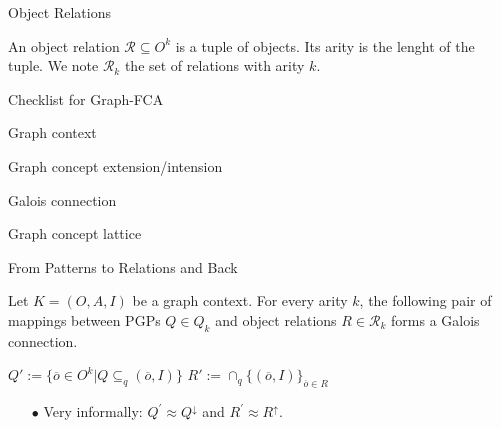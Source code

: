 \documentclass[pdf,xcolor=table]{beamer}
\newcommand{\cmark}{\ding{51}}%
\newcommand{\done}{\rlap{$\square$}{\raisebox{2pt}{\large\hspace{1pt}\cmark}}%
\hspace{-2.5pt}}
\begin{document}
\begin{frame}[t]{Object Relations}
    \begin{definition}
        An object relation $\mathcal{R} \subseteq O^k$ is a tuple of objects.
        Its arity is the lenght of the tuple.
        We note $\mathcal{R}_k$ the set of relations with arity $k$.
    \end{definition}
\end{frame}

\begin{frame}[t]{Checklist for Graph-FCA}
    \begin{todolist}
        \item[\done] Graph context
        \item[\done] Graph concept extension/intension
        \item Galois connection
        \item Graph concept lattice                
    \end{todolist}
\end{frame}

\begin{frame}[t]{From Patterns to Relations and Back}
    \begin{definition}
        Let $K = (O, A, I)$ be a graph context.
        For every arity $k$, the following pair of mappings between PGPs $Q \in Q_k$ and object relations $R \in \mathcal{R}_k$ forms a Galois connection.
        \begin{center}
            $Q' := \{\overline{o} \in O^k | Q \subseteq_q (\overline{o}, I)\}$
            \hspace{10pt}
            $R' := \cap_q\{(\overline{o}, I) \}_{\overline{o} \in R}$
        \end{center}
    \end{definition}
    \begin{itemize}
        \item[$\bullet$] Very informally: $Q^{'} \approx Q^{\downarrow}$ and $R^{'}\approx R^{\uparrow}$.
    \end{itemize}
\end{frame}
\end{document}
